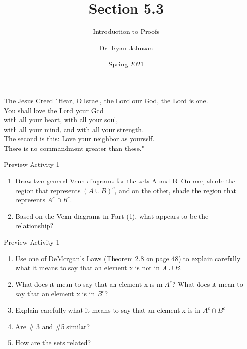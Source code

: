 \documentclass{beamer}
\title{Section 5.3}
\subtitle{Introduction to Proofs}
\author{Dr. Ryan Johnson}
\institute{Grace College}
\date{Spring 2021}
\newcounter{saveenumi}
\newcommand{\seti}{\setcounter{saveenumi}{\value{enumi}}}
\newcommand{\conti}{\setcounter{enumi}{\value{saveenumi}}}
\begin{document}
\begin{frame}[plain]
    \maketitle
\end{frame}

\begin{frame}{The Jesus Creed}
\Large{
"Hear, O Israel, the Lord our God, the Lord is one.\\
You shall love the Lord your God\\
\;\; with all your heart, with all your soul,\\
\;\; with all your mind, and with all your strength.\\
The second is this: Love your neighbor as yourself.\\
There is no commandment greater than these."
}
\end{frame}

\begin{frame}[t]{Preview Activity 1}
    \begin{enumerate}
        \item Draw two general Venn diagrams for the sets A and B. On one, shade the
region that represents $(A \cup B)^c$, and on the other, shade the region that represents
$A^c \cap B^c$.
        \item Based on the Venn diagrams in Part (1), what appears to be the relationship?
        \seti
    \end{enumerate}
\end{frame}

\begin{frame}[t]{Preview Activity 1}
    \begin{enumerate}
        \conti
        \item Use one of DeMorgan’s Laws (Theorem 2.8 on page 48) to explain carefully
what it means to say that an element x is not in $A \cup B$. \pause
        \item What does it mean to say that an element x is in $A^c$? What does it mean to
say that an element x is in $B^c$? \pause
        \item Explain carefully what it means to say that an element x is in $A^c \cap B^c$ \pause
        \item Are \# 3 and \#5 similar?
        \item How are the sets related?
    \end{enumerate}
\end{frame}
\end{document}
